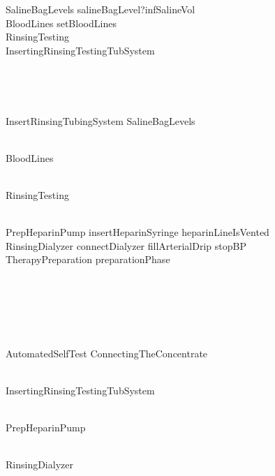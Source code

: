 \begin{circus}
	SalineBagLevels \circdef salineBagLevel?infSalineVol \then \Skip\\
	BloodLines \circdef setBloodLines \then \Skip\\
	RinsingTesting \circdef \Skip\\
	InsertingRinsingTestingTubSystem \circdef \\
	\begin{block}
		\\
		\begin{block}
			\\
			\begin{block}
				InsertRinsingTubingSystem \circseq SalineBagLevels
			\end{block}\\
			 \circseq BloodLines
		\end{block}\\
		 \circseq RinsingTesting
	\end{block}\\
	
	PrepHeparinPump \circdef insertHeparinSyringe \then heparinLineIsVented \then \Skip\\
	RinsingDialyzer \circdef connectDialyzer \then fillArterialDrip \then stopBP \then \Skip\\
	TherapyPreparation \circdef preparationPhase \then \\
	\begin{block}
		\\
		\begin{block}
			\\
			\begin{block}
				\\
				\begin{block}
					AutomatedSelfTest \circseq ConnectingTheConcentrate
				\end{block}\\
				 \circseq InsertingRinsingTestingTubSystem
			\end{block}\\
			 \circseq PrepHeparinPump
		\end{block}\\
		 \circseq RinsingDialyzer
	\end{block}\\
	

\end{circus}
